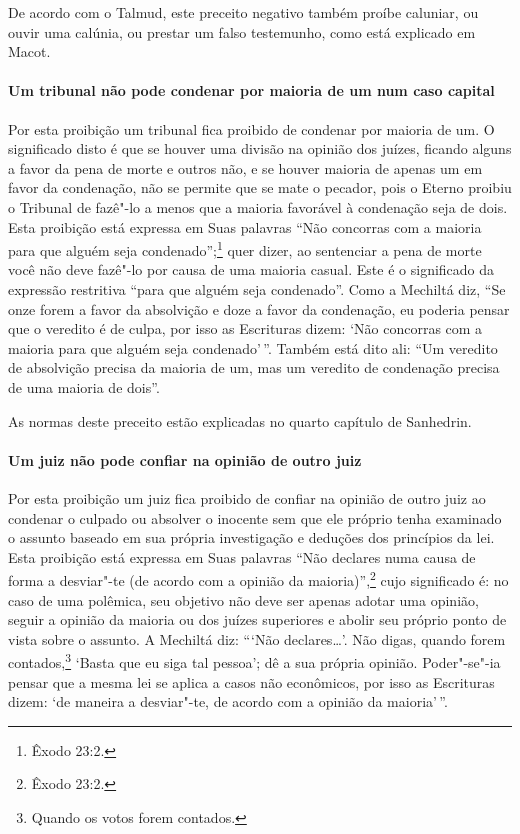 \begin{multicols}{2}
De acordo com o Talmud\starr, este preceito negativo também proíbe caluniar,
ou ouvir uma calúnia, ou prestar um falso testemunho, como está
explicado em Macot\starr.

\paragraph{Um tribunal não pode condenar por maioria de um num caso capital}

Por esta proibição um tribunal fica proibido de condenar por maioria de
um. O significado disto é que se houver uma divisão na opinião dos
juízes, ficando alguns a favor da pena de morte e outros não, e se
houver maioria de apenas um em favor da condenação, não se permite que
se mate o pecador, pois o Eterno proibiu o Tribunal de fazê"-lo a menos
que a maioria favorável à condenação seja de dois. Esta proibição está
expressa em Suas palavras ``Não concorras com a maioria para que alguém
seja condenado'';\footnote{Êxodo 23:2.} quer dizer, ao sentenciar a pena de morte
você não deve fazê"-lo por causa de uma maioria casual. Este é o
significado da expressão restritiva ``para que alguém seja condenado''.
Como a Mechiltá\starr{} diz, ``Se onze forem a favor da absolvição e doze a
favor da condenação, eu poderia pensar que o veredito é de culpa, por
isso as Escrituras dizem: `Não concorras com a maioria para que alguém
seja condenado'\,''. Também está dito ali: ``Um veredito de absolvição
precisa da maioria de um, mas um veredito de condenação precisa de uma
maioria de dois''.

As normas deste preceito estão explicadas no quarto capítulo de Sanhedrin\starr.

\paragraph{Um juiz não pode confiar na opinião de outro juiz}

Por esta proibição um juiz fica proibido de confiar na opinião de outro
juiz ao condenar o culpado ou absolver o inocente sem que ele próprio
tenha examinado o assunto baseado em sua própria investigação e deduções
dos princípios da lei. Esta proibição está expressa em Suas palavras
``Não declares numa causa de forma a desviar"-te (de acordo com a
opinião da maioria)'',\footnote{Êxodo 23:2.} cujo significado é: no caso de uma
polêmica, seu objetivo não deve ser apenas adotar uma opinião, seguir a
opinião da maioria ou dos juízes superiores e abolir seu próprio ponto
de vista sobre o assunto. A Mechiltá\starr{} diz: ```Não declares\ldots{}'. Não
digas, quando forem contados,\footnote{Quando os votos forem contados.} `Basta que eu siga tal pessoa'; dê a sua própria opinião. Poder"-se"-ia pensar que a mesma
lei se aplica a casos não econômicos, por isso as Escrituras dizem: `de
maneira a desviar"-te, de acordo com a opinião da maioria'\,''.


\end{multicols}
